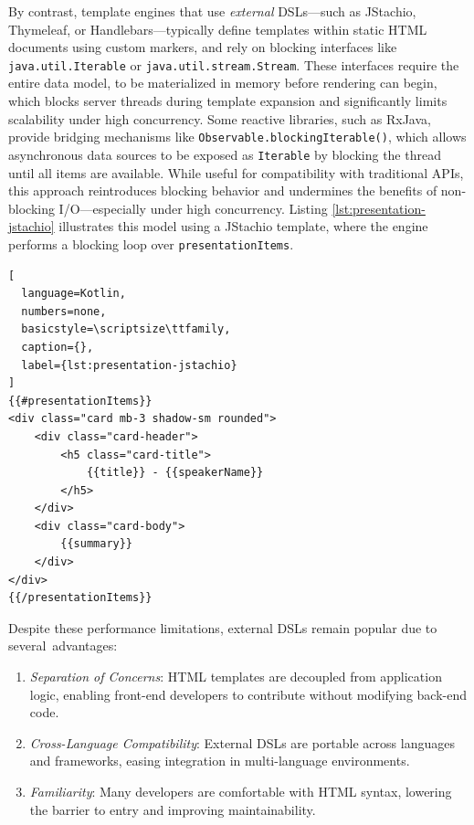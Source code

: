 \documentclass[software,article,accept,pdftex,moreauthors]{Definitions/mdpi}
\begin{document}
By contrast, template engines that use \textit{external} DSLs---such as JStachio,
Thymeleaf, or Handlebars---typically define templates within static HTML
documents using custom markers, and rely on blocking interfaces like
\texttt{java.util.Iterable} or \texttt{java.util.stream.Stream}.
These interfaces require the entire data
model, to be materialized in memory before rendering can begin, which blocks server
threads during template expansion and significantly limits scalability under
high concurrency.
Some reactive libraries, such as RxJava, provide bridging mechanisms like
\texttt{Observable.blockingIterable()}, which allows asynchronous data sources
to be exposed as \texttt{Iterable} by blocking the thread until all items are available.
While useful for compatibility with traditional APIs, this approach
reintroduces blocking behavior and undermines the benefits of non-blocking
I/O---especially under high concurrency. Listing \ref{lst:presentation-jstachio}
illustrates this model using a JStachio template, where the engine performs a
blocking loop over \texttt{presentationItems}.

\begin{listing}[H]
\caption{Presentation HTML template using \textit{JStachio}.}
\begin{lstlisting}[
  language=Kotlin,
  numbers=none,
  basicstyle=\scriptsize\ttfamily,
  caption={},
  label={lst:presentation-jstachio}
]
{{#presentationItems}}
<div class="card mb-3 shadow-sm rounded">
    <div class="card-header">
        <h5 class="card-title">
            {{title}} - {{speakerName}}
        </h5>
    </div>
    <div class="card-body">
        {{summary}}
    </div>
</div>
{{/presentationItems}}
\end{lstlisting}
\end{listing}

Despite these performance limitations, external DSLs remain popular due to
several~advantages:

\begin{enumerate}
    \item \emph{Separation of Concerns}: HTML templates are decoupled from application logic, enabling front-end developers to contribute without modifying back-end code.
    \item \emph{Cross-Language Compatibility}: External DSLs are portable across languages and frameworks, easing integration in multi-language environments.
    \item \emph{Familiarity}: Many developers are comfortable with HTML syntax, lowering the barrier to entry and improving maintainability.
\end{enumerate}
\end{document}
